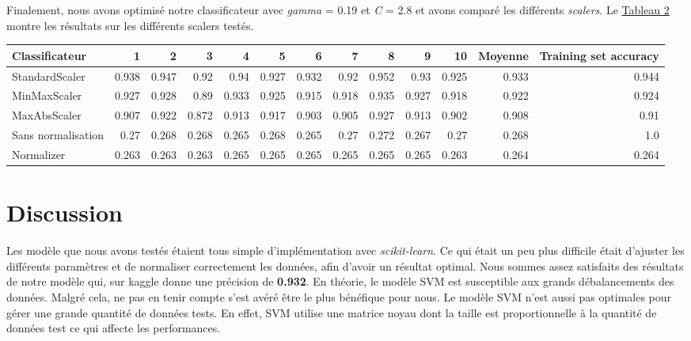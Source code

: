 \documentclass[12pt]{extarticle}
\begin{document}
Finalement, nous avons optimisé notre classificateur avec \emph{gamma} = 0.19 et \emph{C} = 2.8 et avons comparé les différents \emph{scalers}. Le \hyperref[scalers]{Tableau 2} montre les résultats sur les différents scalers testés.
\vspace{2mm}
\vspace*{-5mm}
\label{scalers}
{\scriptsize
\begin{center}
\begin{tabular}{|l|r|r|r|r|r|r|r|r|r|r|r|r|}
\hline
Classificateur & 1 & 2 & 3 & 4 & 5 & 6 & 7 & 8 & 9 & 10 & \textbf{Moyenne} & \textbf{Training set accuracy}\\
\hline
StandardScaler & 0.938 & 0.947 & 0.92 & 0.94 & 0.927 & 0.932 & 0.92 & 0.952 & 0.93 & 0.925 & 0.933 & 0.944\\
\hline
MinMaxScaler & 0.927 & 0.928 & 0.89 & 0.933 & 0.925 & 0.915 & 0.918 & 0.935 & 0.927 & 0.918 & 0.922 & 0.924\\
\hline
MaxAbsScaler & 0.907 & 0.922 & 0.872 & 0.913 & 0.917 & 0.903 & 0.905 & 0.927 & 0.913 & 0.902 & 0.908 & 0.91\\
\hline
Sans normalisation & 0.27 & 0.268 & 0.268 & 0.265 & 0.268 & 0.265 & 0.27 & 0.272 & 0.267 & 0.27 & 0.268 & 1.0\\
\hline
Normalizer & 0.263 & 0.263 & 0.263 & 0.265 & 0.265 & 0.265 & 0.265 & 0.265 & 0.265 & 0.263 & 0.264 & 0.264\\
\hline
\end{tabular}
\end{center}
}

\section{Discussion}
\label{sec:orgcdf2b0b}
\setlength\parindent{20pt}Les modèle que nous avons testés étaient tous simple d'implémentation avec \emph{scikit-learn}. Ce qui était un peu plus difficile était d'ajuster les différents paramètres et de normaliser correctement les données, afin d'avoir un résultat optimal. Nous sommes assez satisfaits des résultats de notre modèle qui, sur kaggle donne une précision de \textbf{0.932}. En théorie, le modèle SVM est susceptible aux grands débalancements des données. Malgré cela, ne pas en tenir compte s'est avéré être le plus bénéfique pour nous. Le modèle SVM n'est aussi pas optimales pour gérer une grande quantité de données tests. En effet, SVM utilise une matrice noyau dont la taille est proportionnelle à la quantité de données test ce qui affecte les performances.
\end{document}
